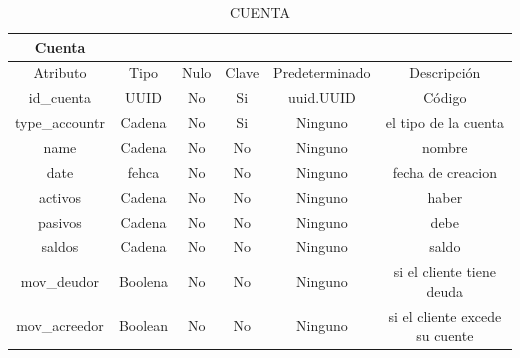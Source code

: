 \documentclass{article}
\begin{document}
\begin{table}[H]
    \centering
    \begin{tabular}{|c|c|c|c|c|c|}
    \hline
Cuenta	& & & & & \\				
\hline

Atributo&	Tipo	&Nulo&	Clave&	Predeterminado	&Descripción\\
\hline

id_cuenta&	UUID&	No&	Si	&uuid.UUID	&Código\\
\hline

type_accountr&	Cadena&	No&	Si	&Ninguno	&el tipo de la cuenta\\
\hline

name	&Cadena&	No&	No&	Ninguno&	nombre\\
\hline

date	&fehca	&No	&No&	Ninguno&	fecha de creacion\\
\hline

activos	&Cadena&	No	&No&	Ninguno	&haber\\
\hline

pasivos	&Cadena&	No	&No	&Ninguno	&debe\\
\hline

saldos	&Cadena&	No&	No&	Ninguno	&saldo\\
\hline

mov_deudor&	Boolena	&No	&No	&Ninguno	&si el cliente tiene deuda\\
\hline

mov_acreedor&	Boolean&	No&	No	&Ninguno&	si el cliente excede su cuente\\
\hline
    \end{tabular}
    \caption{CUENTA}
    \label{}
\end{table}
\end{document}
